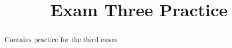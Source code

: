 \documentclass{xourse}
\title{Exam Three Practice}
\begin{document}
\begin{abstract}
Contains practice for the third exam
\end{abstract}
\maketitle

%   


\end{document}
